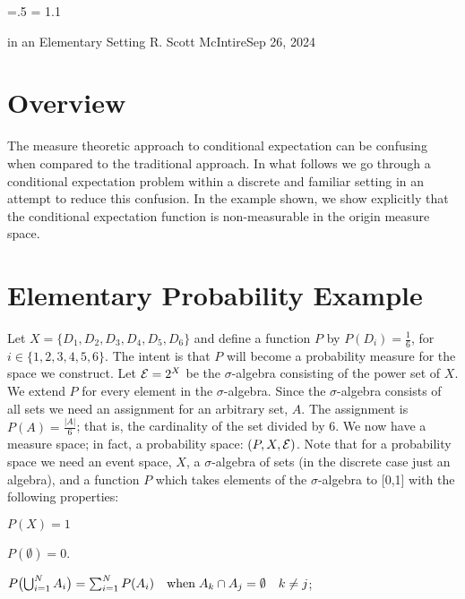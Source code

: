 




\parindent=0pt
\parskip=.5\baselineskip
\baselineskip = 1.1\baselineskip

\footline{\hss\tenrm\folio\hss}

        {in an Elementary Setting}
{R. Scott McIntire}{Sep 26, 2024}

\section{Overview}
The measure theoretic approach to conditional expectation can be confusing
when compared to the traditional approach.
In what follows we go through a conditional 
expectation problem within a discrete and familiar setting in an attempt 
to reduce this confusion. In the example shown, we show explicitly that the 
conditional expectation function is non-measurable in the origin 
measure space.


\section{Elementary Probability Example}
Let $X = \{D_1, D_2, D_3, D_4, D_5, D_6\}$ and define a function $P$ by 
$P(D_i) = \frac{1}{6}$, for $i\in \{1,2,3,4,5,6\}$. The intent is that $P$ will 
become a probability measure for the space we construct.
Let ${\cal E} = 2^X$ be the $\sigma$-algebra 
consisting of the power set of $X$. We extend $P$ for every element in the $\sigma$-algebra.
Since the $\sigma$-algebra consists of all sets 
we need an assignment for an arbitrary set, $A$. 
The assignment is $P(A) = \frac{|A|}{6}$; that is, the cardinality of the set divided by 6.
We now have a measure space; in fact, a probability space: $(P,X,{\cal E})$.
Note that for a probability space we need an event space, $X$, a $\sigma$-algebra of sets 
(in the discrete case just an algebra), and a function $P$ which takes 
elements of the $\sigma$-algebra to [0,1] with the following properties:

\beginEnum
\item{$P(X) = 1$}
\item{$P(\emptyset) = 0$.}
\item{$
P\bigl(\mathop{\bigcup}_{i=1}^N A_i\bigr) = \sum_{i=1}^N P(A_i) 
\quad {\rm when}\;  A_k \cap A_j = \emptyset \quad k\neq j
$;}
\endEnum

